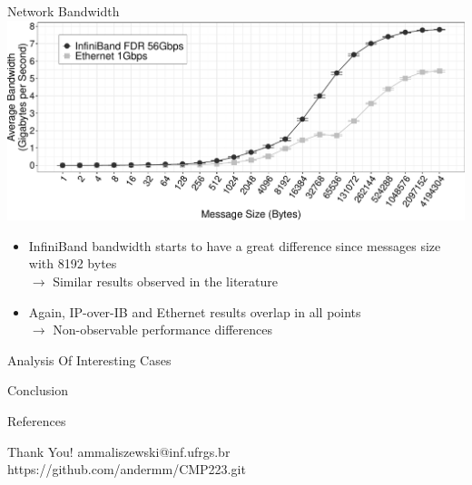 \documentclass{beamer}
\begin{document}
\begin{frame}{Network Bandwidth}
\includegraphics[width=\textwidth]{SLIDES/img/Bandwidth.pdf}
\vfill\pause
\begin{itemize}
    \item InfiniBand bandwidth starts to have a great difference since messages size with 8192 bytes\\
        $\to$ Similar results observed in the literature
    \item\pause Again, IP-over-IB and Ethernet results overlap in all points\\
        $\to$ Non-observable performance differences
\end{itemize}
\end{frame}

\begin{frame}{Analysis Of Interesting Cases}

\end{frame}

\begin{frame}{Conclusion}

\end{frame}

\begin{frame}{References}

\end{frame}
\logo{}

\begin{frame}{}
\begin{center}
\Huge{Thank You!}
\vfill
\Large{ammaliszewski@inf.ufrgs.br}
\vfill
\small{https://github.com/andermm/CMP223.git}
\end{center}
\end{frame}

\maketitle
\end{document}
